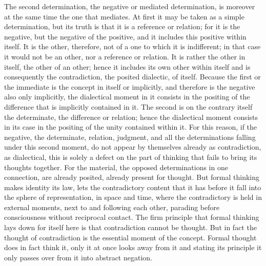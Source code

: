 The second determination, the negative or mediated determination, is
moreover at the same time the one that mediates. At first it may be taken as
a simple determination, but its truth is that it is a reference or relation; for
it is the negative, but the negative of the positive, and it includes this positive
within itself. It is the other, therefore, not of a one to which it is indifferent;
in that case it would not be an other, nor a reference or relation. It is rather
the other in itself, the other of an other; hence it includes its own other within
itself and is consequently the contradiction, the posited dialectic, of itself.
Because the first or the immediate is the concept in itself or implicitly,
and therefore is the negative also only implicitly, the dialectical moment
in it consists in the positing of the difference that is implicitly contained
in it. The second is on the contrary itself the determinate, the difference or
relation; hence the dialectical moment consists in its case in the positing
of the unity contained within it.
 For this reason, if the negative, the
determinate, relation, judgment, and all the determinations falling under
this second moment, do not appear by themselves already as contradiction,
as dialectical, this is solely a defect on the part of thinking that fails to bring
its thoughts together. For the material, the opposed determinations in one
connection, are already posited, already present for thought. But formal
thinking makes identity its law, lets the contradictory content that it has
before it fall into the sphere of representation, in space and time, where
the contradictory is held in external moments, next to and following each
other, parading before consciousness without reciprocal contact. The firm
principle that formal thinking lays down for itself here is that contradiction
cannot be thought. But in fact the thought of contradiction is the essential
moment of the concept. Formal thought does in fact think it, only it at
once looks away from it and stating its principle it only passes over from it
into abstract negation.

